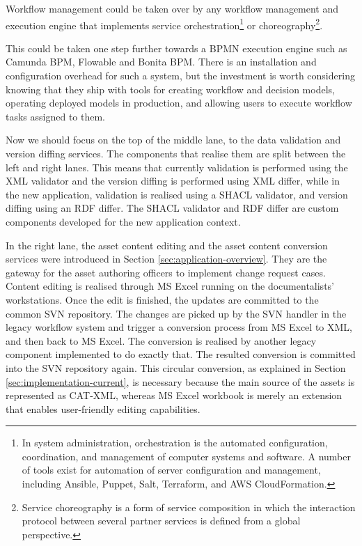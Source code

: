	Workflow management could be taken over by any workflow management and execution engine that implements service orchestration\footnote{In system administration, orchestration is the automated configuration, coordination, and management of computer systems and software. A number of tools exist for automation of server configuration and management, including Ansible, Puppet, Salt, Terraform, and AWS CloudFormation.} or choreography\footnote{Service choreography is a form of service composition in which the interaction protocol between several partner services is defined from a global perspective.}. 
	
	This could be taken one step further towards a BPMN \citep{bpmn-introduction} execution engine such as Camunda BPM, Flowable and Bonita BPM. There is an installation and configuration overhead for such a system, but the investment is worth considering knowing that they ship with tools for creating workflow and decision models, operating deployed models in production, and allowing users to execute workflow tasks assigned to them. 
	
	Now we should focus on the top of the middle lane, to the data validation and version diffing services. The components that realise them are split between the left and right lanes. This means that currently validation is performed using the XML validator and the version diffing is performed using XML differ, while in the new application, validation is realised using a SHACL \citep{shacl-spec} validator, and version diffing using an RDF differ. The SHACL validator and RDF differ are custom components developed for the new application context.
	
	In the right lane, the asset content editing and the asset content conversion services were introduced in Section \ref{sec:application-overview}. They are the gateway for the asset authoring officers to implement change request cases. Content editing is realised through MS Excel running on the documentalists' workstations. Once the edit is finished, the updates are committed to the common SVN repository. The changes are picked up by the SVN handler in the legacy workflow system and trigger a conversion process from MS Excel to XML, and then back to MS Excel. The conversion is realised by another legacy component implemented to do exactly that. The resulted conversion is committed into the SVN repository again. This circular conversion, as explained in Section \ref{sec:implementation-current}, is necessary because the main source of the assets is represented as CAT-XML, whereas MS Excel workbook is merely an extension that enables user-friendly editing capabilities.
	
